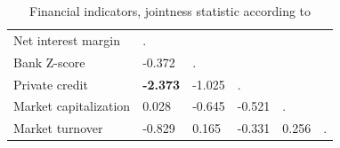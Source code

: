 \begin{subappendices}
\begin{table}[!htbp]
\caption{Financial indicators, jointness statistic according to \citet{doppelhoferweeks2009}}
\label{ch2tab:joint3}
\small
\centering
\begin{tabular}{llllll}
   \toprule
  Net interest margin & . &  &  & & \\ 
  Bank Z-score & -0.372 & . &  &  & \\ 
  Private credit & \textbf{-2.373} & -1.025 & . &  & \\ 
  Market capitalization & 0.028 & -0.645 & -0.521 & . & \\ 
  Market turnover & -0.829 & 0.165 & -0.331 & 0.256 & . \\ 
   \bottomrule
\end{tabular}
\end{table}  
%
\end{subappendices}